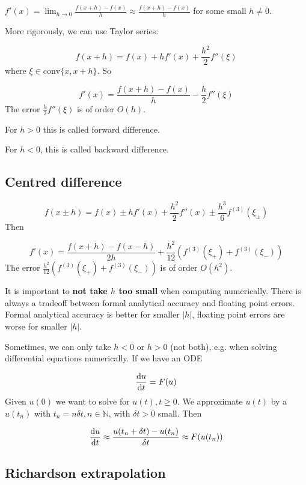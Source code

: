 $f'(x) = \lim_{h \rightarrow 0} \frac{f(x + h) - f(x)}{h} \approx \frac{f(x + h) - f(x)}{h}$ for some small $h \ne 0$.

More rigorously, we can use Taylor series:

\[ f(x + h) = f(x) + h f'(x) + \frac{h^2}{2} f''(\xi) \]
where $\xi \in \text{conv} \{x, x + h \}$. So

\[ f'(x) = \frac{f(x + h) - f(x)}{h} - \frac{h}{2} f''(\xi) \]
The error $\frac{h}{2} f''(\xi)$ is of order $O(h)$.

For $h > 0$ this is called forward difference.

For $h < 0$, this is called backward difference.

\subsection{Centred difference}

\[ f(x \pm h) = f(x) \pm h f'(x) + \frac{h^2}{2} f''(x) \pm \frac{h^3}{6} f^{(3)}(\xi_{\pm}) \]
Then

\[ f'(x) = \frac{f(x + h) - f(x - h)}{2h} + \frac{h^2}{12} \left( f^{(3)}(\xi_+) + f^{(3)}(\xi_-) \right) \]
The error $\frac{h^2}{12} \left( f^{(3)}(\xi_+) + f^{(3)}(\xi_-) \right)$ is of order $O(h^2)$.

\begin{remark}
	It is important to \textbf{not take $h$ too small} when computing numerically. There is always a tradeoff between formal analytical accuracy and floating point errors. Formal analytical accuracy is better for smaller $|h|$, floating point errors are worse for smaller $|h|$.
\end{remark}

\begin{remark}
	Sometimes, we can only take $h < 0$ or $h > 0$ (not both), e.g. when solving differential equations numerically. If we have an ODE

	\[ \diff{u}{t} = F(u) \]
	Given $u(0)$ we want to solve for $u(t), t \ge 0$. We approximate $u(t)$ by a $u(t_n)$ with $t_n = n \delta t, n \in \mathbb{N}$, with $\delta t > 0$ small. Then

	\[ \diff{u}{t} \approx \frac{u(t_n + \delta t) - u(t_n)}{\delta t} \approx F(u(t_n)) \]
\end{remark}

\subsection{Richardson extrapolation}

